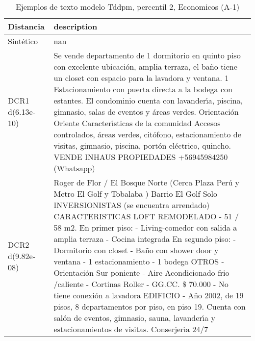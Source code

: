 \begin{table}[H]
\centering
\fontsize{10}{14}\selectfont
\caption{Ejemplos de texto modelo Tddpm, percentil 2, Economicos (A-1)}
\label{table-example-economicos-a-1-tddpm_mlp-2p-text}
\begin{tabular}{|l|m{35em}|}
\hline
\rowcolor[gray]{0.8}
Distancia & description \\
\hline Sintético & nan \\
\hline DCR1 d(6.13e-10) & Se vende departamento de 1 dormitorio en quinto piso con excelente ubicaci\'on, amplia terraza, el ba\~no tiene un closet con espacio para la lavadora y ventana.  1 Estacionamiento con puerta directa a la bodega con estantes. El condominio cuenta con lavander{\'\i}a, piscina, gimnasio, salas de eventos y \'areas verdes. Orientaci\'on Oriente  Caracter{\'\i}sticas de la comunidad Accesos controlados, \'areas verdes, cit\'ofono, estacionamiento de visitas, gimnasio, piscina, port\'on el\'ectrico, quincho.  VENDE INHAUS PROPIEDADES +56945984250 (Whatsapp) \\
\hline DCR2 d(9.82e-08) & Roger de Flor / El Bosque Norte (Cerca Plaza Per\'u y Metro El Golf y Tobalaba ) Barrio El Golf Solo INVERSIONISTAS (se encuentra arrendado)  CARACTERISTICAS LOFT REMODELADO - 51 / 58 m2. En primer piso: - Living-comedor con salida a amplia terraza  - Cocina integrada En segundo piso: - Dormitorio con closet - Ba\~no con shower door y ventana - 1 estacionamiento - 1 bodega  OTROS - Orientaci\'on Sur poniente - Aire Acondicionado frio /caliente - Cortinas Roller - GG.CC. \$ 70.000 - No tiene conexi\'on a lavadora  EDIFICIO - A\~no 2002, de 19 pisos, 8 departamentos por piso, en piso 19. Cuenta con sal\'on de eventos, gimnasio, sauna, lavander{\'\i}a y estacionamientos de visitas. Conserjer{\'\i}a 24/7 \\
\hline
\end{tabular}
\end{table}
